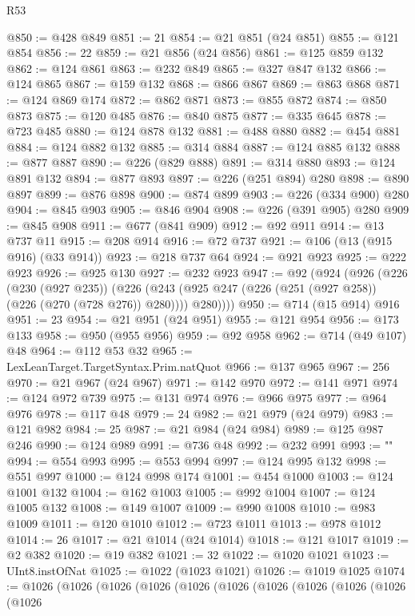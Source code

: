 \begin{lexlean}{R53}
\begin{coremodule}
@850 := @428 @849
@851 := 21
@854 := @21 @851 (@24 @851)
@855 := @121 @854
@856 := 22
@859 := @21 @856 (@24 @856)
@861 := @125 @859 @132
@862 := @124 @861
@863 := @232 @849
@865 := @327 @847 @132
@866 := @124 @865
@867 := @159 @132
@868 := @866 @867
@869 := @863 @868
@871 := @124 @869 @174
@872 := @862 @871
@873 := @855 @872
@874 := @850 @873
@875 := @120 @485
@876 := @840 @875
@877 := @335 @645
@878 := @723 @485
@880 := @124 @878 @132
@881 := @488 @880
@882 := @454 @881
@884 := @124 @882 @132
@885 := @314 @884
@887 := @124 @885 @132
@888 := @877 @887
@890 := @226 (@829 @888)
@891 := @314 @880
@893 := @124 @891 @132
@894 := @877 @893
@897 := @226 (@251 @894) @280
@898 := @890 @897
@899 := @876 @898
@900 := @874 @899
@903 := @226 (@334 @900) @280
@904 := @845 @903
@905 := @846 @904
@908 := @226 (@391 @905) @280
@909 := @845 @908
@911 := @677 (@841 @909)
@912 := @92 @911
@914 := @13 @737 @11
@915 := @208 @914
@916 := @72 @737
@921 := @106 (@13 (@915 @916) (@33 @914))
@923 := @218 @737 @64
@924 := @921 @923
@925 := @222 @923
@926 := @925 @130
@927 := @232 @923
@947 := @92
    (@924
      (@926
        (@226
          (@230 (@927 @235))
          (@226 (@243 (@925 @247 (@226 (@251 (@927 @258)) (@226 (@270 (@728 @276)) @280)))) @280))))
@950 := @714 (@15 @914) @916
@951 := 23
@954 := @21 @951 (@24 @951)
@955 := @121 @954
@956 := @173 @133
@958 := @950 (@955 @956)
@959 := @92 @958
@962 := @714 (@49 @107) @48
@964 := @112 @53 @32
@965 := LexLeanTarget.TargetSyntax.Prim.natQuot
@966 := @137 @965
@967 := 256
@970 := @21 @967 (@24 @967)
@971 := @142 @970
@972 := @141 @971
@974 := @124 @972 @739
@975 := @131 @974
@976 := @966 @975
@977 := @964 @976
@978 := @117 @48
@979 := 24
@982 := @21 @979 (@24 @979)
@983 := @121 @982
@984 := 25
@987 := @21 @984 (@24 @984)
@989 := @125 @987 @246
@990 := @124 @989
@991 := @736 @48
@992 := @232 @991
@993 := "\n"
@994 := @554 @993
@995 := @553 @994
@997 := @124 @995 @132
@998 := @551 @997
@1000 := @124 @998 @174
@1001 := @454 @1000
@1003 := @124 @1001 @132
@1004 := @162 @1003
@1005 := @992 @1004
@1007 := @124 @1005 @132
@1008 := @149 @1007
@1009 := @990 @1008
@1010 := @983 @1009
@1011 := @120 @1010
@1012 := @723 @1011
@1013 := @978 @1012
@1014 := 26
@1017 := @21 @1014 (@24 @1014)
@1018 := @121 @1017
@1019 := @2 @382
@1020 := @19 @382
@1021 := 32
@1022 := @1020 @1021
@1023 := UInt8.instOfNat
@1025 := @1022 (@1023 @1021)
@1026 := @1019 @1025
@1074 := @1026
    (@1026
      (@1026
        (@1026
          (@1026
            (@1026
              (@1026
                (@1026
                  (@1026
                    (@1026
                      (@1026

\end{coremodule}
\end{lexlean}

